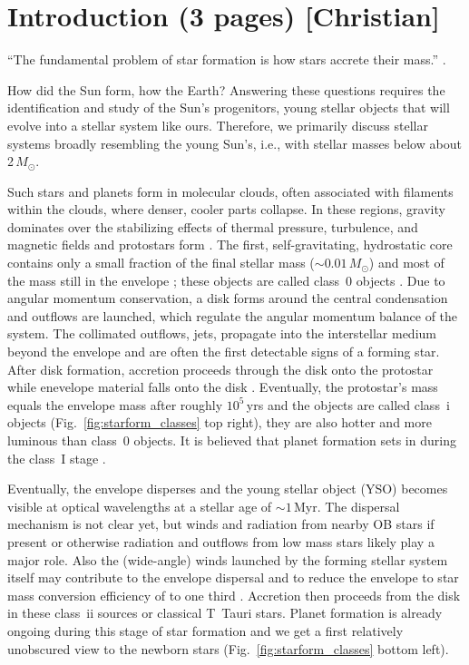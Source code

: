 
\section{Introduction {\normalfont (3 pages) [Christian]}}

``The fundamental problem of star formation is how stars accrete their mass.'' \citep{Dunham_2014}.


How did the Sun form, how the Earth? Answering these questions requires the identification and study of the Sun's progenitors,  young stellar objects that will evolve into a stellar system like ours. Therefore, we primarily discuss stellar systems broadly resembling the young Sun's, i.e., with stellar masses below about 2$\,M_\odot$.

Such stars and planets form in molecular clouds, often associated with filaments within the clouds,  where denser, cooler parts collapse. In these regions, gravity dominates over the stabilizing effects of thermal pressure, turbulence, and magnetic fields \citep[e.g., ][]{McKee_2007} and protostars form  \citep{Andre_2014}. The first, self-gravitating, hydrostatic core contains only a small fraction of the final stellar mass ($\sim0.01\,M_\odot$) and most of the mass still in the envelope \citep[e.g.,][]{Gong_2015,Lee_2020}; these objects are called class~0 objects \citep[see Fig.~\ref{fig:starform_classes} top left, and ][]{Andre_1993, Larson_2003}. Due to angular momentum conservation, a disk forms around the central condensation and outflows are launched, which regulate the angular momentum balance of the system. The collimated outflows, jets, propagate into the interstellar medium beyond the envelope and are often the first detectable signs of a forming star. After disk formation, accretion proceeds through the disk onto the protostar while enevelope material falls onto the disk \citep{Padoan_2014}. Eventually, the protostar's mass equals the envelope mass after roughly $10^5$\,yrs and the objects are called class~{\sc i} objects (Fig.~\ref{fig:starform_classes} top right), they are also hotter and more luminous than class~0 objects. It is believed that planet formation sets in during the class~I stage \citep{}.

Eventually, the envelope disperses and the young stellar object (YSO) becomes visible at optical wavelengths at a stellar age of $\sim1\,$Myr. The dispersal mechanism is not clear yet, but winds and radiation from nearby OB stars if present or otherwise radiation and outflows from low mass stars likely play a major role. Also the (wide-angle) winds launched by the forming stellar system itself may contribute to the envelope dispersal and to reduce the envelope to star mass conversion efficiency of to one third \citep{Frank_2014}. Accretion then proceeds from the disk in these class~{\sc ii} sources or classical T~Tauri stars. Planet formation is already ongoing during this stage of star formation and we get a first relatively unobscured view to the newborn stars (Fig.~\ref{fig:starform_classes} bottom left).

